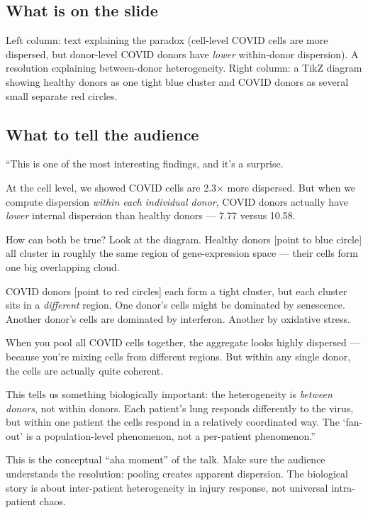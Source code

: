 \documentclass[11pt]{article}
\begin{document}
\subsection{What is on the slide}

Left column: text explaining the paradox (cell-level COVID cells are more dispersed, but donor-level COVID donors have \emph{lower} within-donor dispersion). A resolution explaining between-donor heterogeneity. Right column: a TikZ diagram showing healthy donors as one tight blue cluster and COVID donors as several small separate red circles.

\subsection{What to tell the audience}

\begin{speaknote}
``This is one of the most interesting findings, and it's a surprise.

At the cell level, we showed COVID cells are 2.3$\times$ more dispersed. But when we compute dispersion \emph{within each individual donor}, COVID donors actually have \emph{lower} internal dispersion than healthy donors --- 7.77 versus 10.58.

How can both be true? Look at the diagram. Healthy donors [point to blue circle] all cluster in roughly the same region of gene-expression space --- their cells form one big overlapping cloud.

COVID donors [point to red circles] each form a tight cluster, but each cluster sits in a \emph{different} region. One donor's cells might be dominated by senescence. Another donor's cells are dominated by interferon. Another by oxidative stress.

When you pool all COVID cells together, the aggregate looks highly dispersed --- because you're mixing cells from different regions. But within any single donor, the cells are actually quite coherent.

This tells us something biologically important: the heterogeneity is \emph{between donors}, not within donors. Each patient's lung responds differently to the virus, but within one patient the cells respond in a relatively coordinated way. The `fan-out' is a population-level phenomenon, not a per-patient phenomenon.''
\end{speaknote}

\begin{resultbox}
This is the conceptual ``aha moment'' of the talk. Make sure the audience understands the resolution: pooling creates apparent dispersion. The biological story is about inter-patient heterogeneity in injury response, not universal intra-patient chaos.
\end{resultbox}
\end{document}

